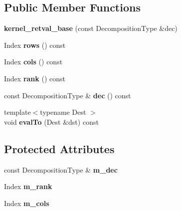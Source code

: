 \subsection*{Public Member Functions}
\begin{DoxyCompactItemize}
\item 
\mbox{\label{struct_eigen_1_1internal_1_1kernel__retval__base_a11788fc65643a5f04d0bf93eb14ab859}} 
{\bfseries kernel\+\_\+retval\+\_\+base} (const Decomposition\+Type \&dec)
\item 
\mbox{\label{struct_eigen_1_1internal_1_1kernel__retval__base_a4c2aa4eeb487d1d3bb12a40511a9e1f2}} 
Index {\bfseries rows} () const
\item 
\mbox{\label{struct_eigen_1_1internal_1_1kernel__retval__base_ab572364061c0337d460111330aaa5720}} 
Index {\bfseries cols} () const
\item 
\mbox{\label{struct_eigen_1_1internal_1_1kernel__retval__base_a2c0455b0ab8b9393fb1e0b1e9c030171}} 
Index {\bfseries rank} () const
\item 
\mbox{\label{struct_eigen_1_1internal_1_1kernel__retval__base_a8aaed82445258ea7bc1d68dac12bad9a}} 
const Decomposition\+Type \& {\bfseries dec} () const
\item 
\mbox{\label{struct_eigen_1_1internal_1_1kernel__retval__base_ad57b289ee5554aed56b35e72f2a7eecc}} 
{\footnotesize template$<$typename Dest $>$ }\\void {\bfseries eval\+To} (Dest \&dst) const
\end{DoxyCompactItemize}
\subsection*{Protected Attributes}
\begin{DoxyCompactItemize}
\item 
\mbox{\label{struct_eigen_1_1internal_1_1kernel__retval__base_a8a12c3617a10856609ad9c579e123ca4}} 
const Decomposition\+Type \& {\bfseries m\+\_\+dec}
\item 
\mbox{\label{struct_eigen_1_1internal_1_1kernel__retval__base_ab6aa58bd963e544e2954ed0e418693fd}} 
Index {\bfseries m\+\_\+rank}
\item 
\mbox{\label{struct_eigen_1_1internal_1_1kernel__retval__base_a1802142c98988ef3439852801e34a3b8}} 
Index {\bfseries m\+\_\+cols}
\end{DoxyCompactItemize}


